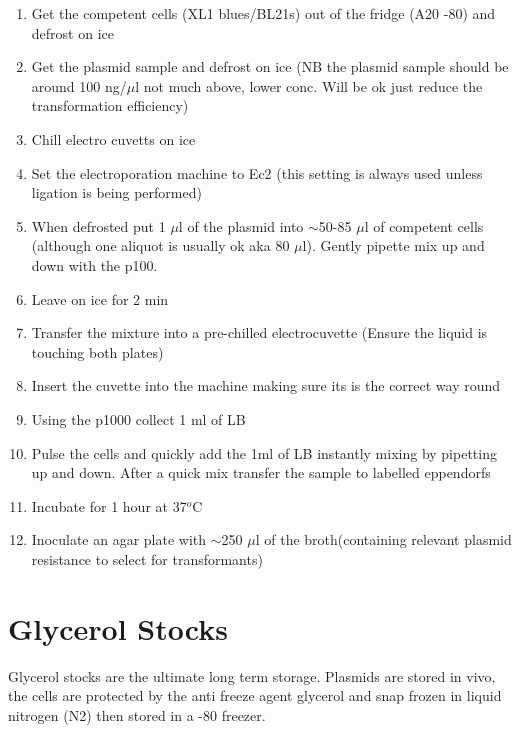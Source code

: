 \documentclass{tufte-book} %
\begin{document}
\begin{enumerate}
\item Get the competent cells (XL1 blues/BL21s) out of the fridge (A20 -80) and defrost on ice
\item Get the plasmid sample and defrost on ice (NB the plasmid sample should be around 100 ng/$\mu$l not much above, lower conc. Will be ok just reduce the transformation efficiency)
\item Chill electro cuvetts on ice
\item Set the electroporation machine to Ec2 (this setting is always used unless ligation is being performed)
\item When defrosted put 1 $\mu$l of the plasmid into $\sim$50-85 $\mu$l of competent cells (although one aliquot is usually ok aka 80 $\mu$l). Gently pipette mix up and down with the p100.
\item Leave on ice for 2 min
\item Transfer the mixture into a pre-chilled electrocuvette (Ensure the liquid is touching both plates)
\item Insert the cuvette into the machine making sure its is the correct way round
\item Using the p1000 collect 1 ml of LB
\item Pulse the cells and quickly add the 1ml of LB instantly mixing by pipetting up and down. After a quick mix transfer the sample to labelled eppendorfs
\item Incubate for 1 hour at 37$^{o}$C
\item Inoculate an agar plate with $\sim$250 $\mu$l of the broth(containing relevant plasmid resistance to select for transformants)
\end{enumerate}

\newpage
\section{Glycerol Stocks}

Glycerol stocks are the ultimate long term storage. Plasmids are stored in vivo, the cells are protected by the anti freeze agent glycerol and snap frozen in liquid nitrogen (N2) then stored in a -80 freezer.
\end{document}
